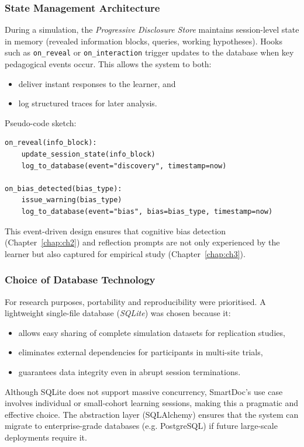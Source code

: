 \subsubsection{State Management Architecture}

During a simulation, the \emph{Progressive Disclosure Store} maintains
session-level state in memory (revealed information blocks, queries,
working hypotheses). Hooks such as \texttt{on\_reveal} or
\texttt{on\_interaction} trigger updates to the database when key
pedagogical events occur. This allows the system to both:
\begin{itemize}
    \item deliver instant responses to the learner, and
    \item log structured traces for later analysis.
\end{itemize}

Pseudo-code sketch:

\begin{verbatim}
on_reveal(info_block):
    update_session_state(info_block)
    log_to_database(event="discovery", timestamp=now)

on_bias_detected(bias_type):
    issue_warning(bias_type)
    log_to_database(event="bias", bias=bias_type, timestamp=now)
\end{verbatim}

This event-driven design ensures that cognitive bias detection (Chapter~\ref{chap:ch2})
and reflection prompts are not only experienced by the learner but also captured for
empirical study (Chapter~\ref{chap:ch3}).

\subsubsection{Choice of Database Technology}

For research purposes, portability and reproducibility were prioritised.
A lightweight single-file database (\emph{SQLite}) was chosen because it:
\begin{itemize}
    \item allows easy sharing of complete simulation datasets for replication studies,
    \item eliminates external dependencies for participants in multi-site trials,
    \item guarantees data integrity even in abrupt session terminations.
\end{itemize}
Although SQLite does not support massive concurrency, SmartDoc’s use case involves
individual or small-cohort learning sessions, making this a pragmatic and effective choice.
The abstraction layer (SQLAlchemy) ensures that the system can migrate to enterprise-grade
databases (e.g. PostgreSQL) if future large-scale deployments require it.

